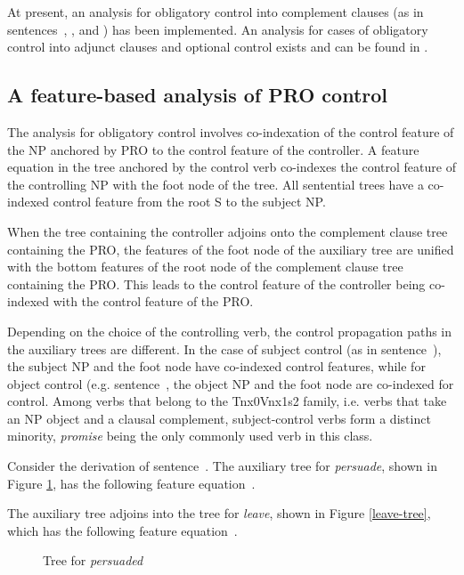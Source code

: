 At present, an analysis for obligatory control into complement clauses (as
in sentences~, , and ) has been implemented. An
analysis for cases of obligatory control into adjunct clauses and optional
control exists and can be found in \cite{bhatt94}.

\subsection{A feature-based analysis of PRO control}
The analysis for obligatory control involves co-indexation of the control
feature of the NP anchored by PRO to the control feature of the controller.
A feature equation in the tree anchored by the control verb co-indexes the
control feature of the controlling NP with the foot node of the tree.  All
sentential trees have a co-indexed control feature from the root S to the
subject NP.

When the tree containing the controller adjoins onto the complement clause
tree containing the PRO, the features of the foot node of the auxiliary
tree are unified with the bottom features of the root node of the
complement clause tree containing the PRO. This leads to the control
feature of the controller being co-indexed with the control feature of the
PRO.

Depending on the choice of the controlling verb, the control propagation
paths in the auxiliary trees are different.  In the case of subject control
(as in sentence~), the subject NP and the foot node have
co-indexed control features, while for object control
(e.g. sentence~, the object NP and the foot node are co-indexed
for control. Among verbs that belong to the Tnx0Vnx1s2 family, i.e. verbs
that take an NP object and a clausal complement, subject-control verbs form
a distinct minority, {\em promise} being the only commonly used verb in
this class.


Consider the derivation of sentence~. The auxiliary tree for
{\em persuade}, shown in Figure \ref{persuade-tree}, has the following
feature equation~.


The auxiliary tree adjoins into the tree for {\em leave}, shown in Figure
\ref{leave-tree}, which has the following feature equation~.


\begin{figure}[hbt]
\centering
\hspace{0.0in}
\caption{Tree for {\it persuaded}}
\label{persuade-tree}
\end{figure}

